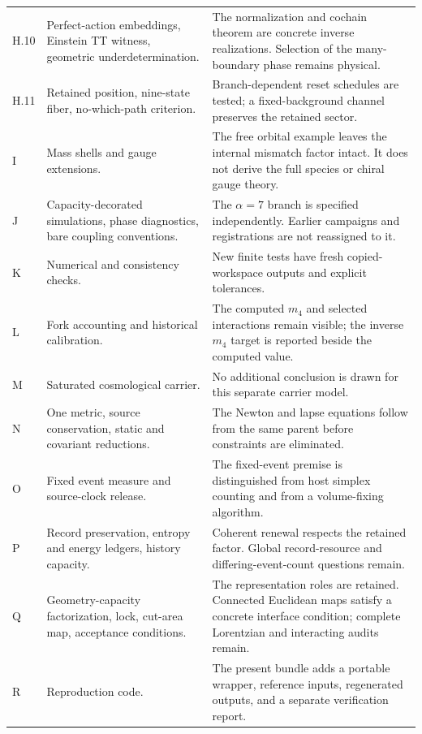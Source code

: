 \begin{longtable}{@{}L{0.12\textwidth}L{0.39\textwidth}L{0.43\textwidth}@{}}
H.10 & Perfect-action embeddings, Einstein TT witness, geometric underdetermination. & The normalization and cochain theorem are concrete inverse realizations. Selection of the many-boundary phase remains physical.\\[4pt]
H.11 & Retained position, nine-state fiber, no-which-path criterion. & Branch-dependent reset schedules are tested; a fixed-background channel preserves the retained sector.\\[4pt]
I & Mass shells and gauge extensions. & The free orbital example leaves the internal mismatch factor intact. It does not derive the full species or chiral gauge theory.\\[4pt]
J & Capacity-decorated simulations, phase diagnostics, bare coupling conventions. & The $\alpha=7$ branch is specified independently. Earlier campaigns and registrations are not reassigned to it.\\[4pt]
K & Numerical and consistency checks. & New finite tests have fresh copied-workspace outputs and explicit tolerances.\\[4pt]
L & Fork accounting and historical calibration. & The computed $m_4$ and selected interactions remain visible; the inverse $m_4$ target is reported beside the computed value.\\[4pt]
M & Saturated cosmological carrier. & No additional conclusion is drawn for this separate carrier model.\\[4pt]
N & One metric, source conservation, static and covariant reductions. & The Newton and lapse equations follow from the same parent before constraints are eliminated.\\[4pt]
O & Fixed event measure and source-clock release. & The fixed-event premise is distinguished from host simplex counting and from a volume-fixing algorithm.\\[4pt]
P & Record preservation, entropy and energy ledgers, history capacity. & Coherent renewal respects the retained factor. Global record-resource and differing-event-count questions remain.\\[4pt]
Q & Geometry-capacity factorization, lock, cut-area map, acceptance conditions. & The representation roles are retained. Connected Euclidean maps satisfy a concrete interface condition; complete Lorentzian and interacting audits remain.\\[4pt]
R & Reproduction code. & The present bundle adds a portable wrapper, reference inputs, regenerated outputs, and a separate verification report.\\
\end{longtable}

